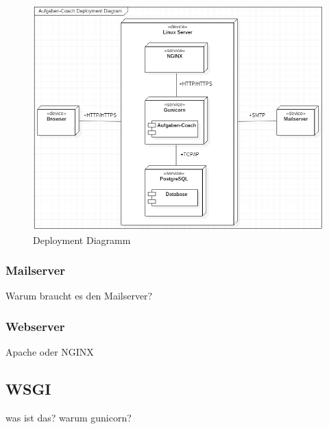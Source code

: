 \begin{figure}[H]
\begin{center}
	\includegraphics[width=\textwidth, keepaspectratio]{images/deployment_diagram.png}
	\caption{Deployment Diagramm}
	\label{fig:deployment_diagram}
\end{center}
\end{figure}

\subsubsection*{Mailserver}
Warum braucht es den Mailserver?

\subsubsection*{Webserver}
Apache oder NGINX

\subsection*{WSGI}
was ist das? warum gunicorn?

